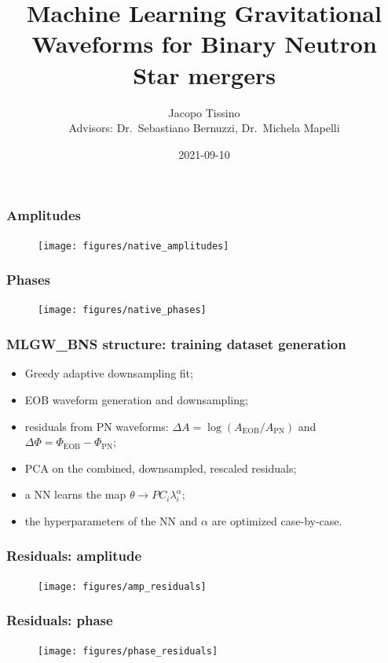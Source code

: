 \documentclass{beamer}
\title{Machine Learning Gravitational Waveforms for Binary Neutron Star mergers}
\author{Jacopo Tissino \\ Advisors: Dr.\ Sebastiano Bernuzzi, Dr.\ Michela Mapelli}
\date{2021-09-10}
\begin{document}
\frame{\titlepage}

\begin{frame}
    \frametitle{Amplitudes}
    \begin{figure}[ht]
    \centering
    \texttt{[image: figures/native\_amplitudes]}
    \label{fig:native_amplitudes}
    \end{figure}
\end{frame}

\begin{frame}
    \frametitle{Phases}
    \begin{figure}[ht]
    \centering
    \texttt{[image: figures/native\_phases]}
    \label{fig:native_phases}
    \end{figure}
\end{frame}

\begin{frame}
    \frametitle{MLGW\_BNS structure: training dataset generation}
    \begin{itemize}
    \item Greedy adaptive downsampling fit;
    \item EOB waveform generation and downsampling;
    \item residuals from PN waveforms: \(\Delta A = \log (A _{\text{EOB}}/ A _{\text{PN}})\) and \(\Delta \Phi = \Phi _{\text{EOB}} - \Phi _{\text{PN}}\);
    \item PCA on the combined, downsampled, rescaled residuals;
    \item a NN learns the map \(\theta \to PC_i \lambda_i^{\alpha}\);
    \item the hyperparameters of the NN and \(\alpha \) are optimized case-by-case.
    \end{itemize}
\end{frame}

\begin{frame}
    \frametitle{Residuals: amplitude}
    \begin{figure}[ht]
    \centering
    \texttt{[image: figures/amp\_residuals]}
    \label{fig:amp_residuals}
    \end{figure}
\end{frame}

\begin{frame}
    \frametitle{Residuals: phase}
    \begin{figure}[ht]
    \centering
    \texttt{[image: figures/phase\_residuals]}
    \label{fig:phase_residuals}
    \end{figure}
\end{frame}
\end{document}
